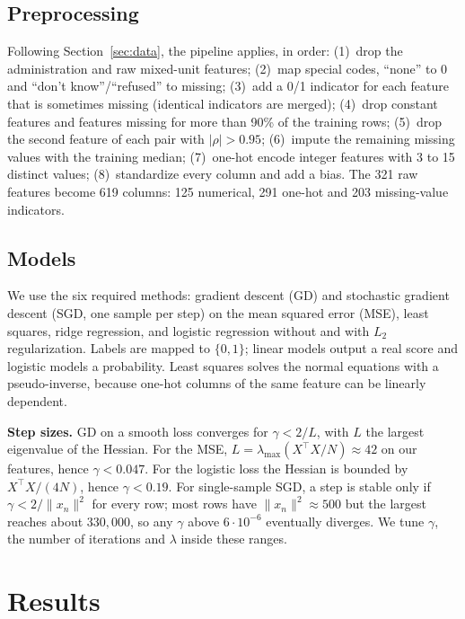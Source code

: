\documentclass[10pt,conference,compsocconf]{IEEEtran}
\begin{document}
\subsection{Preprocessing}

Following Section~\ref{sec:data}, the pipeline applies, in order:
(1)~drop the administration and raw mixed-unit features;
(2)~map special codes, ``none'' to 0 and ``don't know''/``refused'' to
missing;
(3)~add a 0/1 indicator for each feature that is sometimes missing (identical
indicators are merged);
(4)~drop constant features and features missing for more than 90\% of the
training rows;
(5)~drop the second feature of each pair with $|\rho| > 0.95$;
(6)~impute the remaining missing values with the training median;
(7)~one-hot encode integer features with 3 to 15 distinct values;
(8)~standardize every column and add a bias.
The 321 raw features become 619 columns: 125 numerical, 291 one-hot and 203
missing-value indicators.

\subsection{Models}

We use the six required methods: gradient descent (GD) and stochastic
gradient descent (SGD, one sample per step) on the mean squared error (MSE),
least squares, ridge regression, and logistic regression without and with
$L_2$ regularization. Labels are mapped to $\{0,1\}$; linear models output a
real score and logistic models a probability. Least squares solves the normal
equations with a pseudo-inverse, because one-hot columns of the same feature
can be linearly dependent.

\textbf{Step sizes.} GD on a smooth loss converges for $\gamma < 2/L$, with
$L$ the largest eigenvalue of the Hessian. For the MSE,
$L = \lambda_{\max}(X^\top X/N) \approx 42$ on our features, hence
$\gamma < 0.047$. For the logistic loss the Hessian is bounded by
$X^\top X/(4N)$, hence $\gamma < 0.19$. For single-sample SGD, a step is
stable only if $\gamma < 2/\|x_n\|^2$ for every row; most rows have
$\|x_n\|^2 \approx 500$ but the largest reaches about $330{,}000$, so any
$\gamma$ above $6\cdot 10^{-6}$ eventually diverges. We tune $\gamma$, the
number of iterations and $\lambda$ inside these ranges.

\section{Results}
\end{document}
